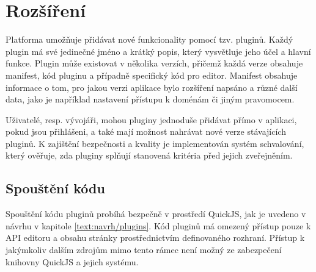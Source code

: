 


\section{Rozšíření}

Platforma umožňuje přidávat nové funkcionality pomocí tzv. pluginů. 
Každý plugin má své jedinečné jméno a krátký popis, který vysvětluje jeho účel a hlavní funkce. 
Plugin může existovat v několika verzích, přičemž každá verze obsahuje manifest, kód pluginu a případně specifický kód pro editor.
Manifest obsahuje informace o tom, pro jakou verzi aplikace bylo rozšíření napsáno a různé další data, jako je například nastavení přístupu k doménám či jiným pravomocem.

Uživatelé, resp. vývojáři, mohou pluginy jednoduše přidávat přímo v aplikaci, pokud jsou přihlášeni, a také mají možnost nahrávat nové verze stávajících pluginů. 
K zajištění bezpečnosti a kvality je implementován systém schvalování, který ověřuje, zda pluginy splňují stanovená kritéria před jejich zveřejněním.

\subsection{Spouštění kódu}

Spouštění kódu pluginů probíhá bezpečně v prostředí QuickJS, jak je uvedeno v návrhu v kapitole \ref{text:navrh/plugins}. 
Kód pluginů má omezený přístup pouze k API editoru a obsahu stránky prostřednictvím definovaného rozhraní. 
Přístup k jakýmkoliv dalším zdrojům mimo tento rámec není možný ze zabezpečení knihovny QuickJS a jejich systému.

